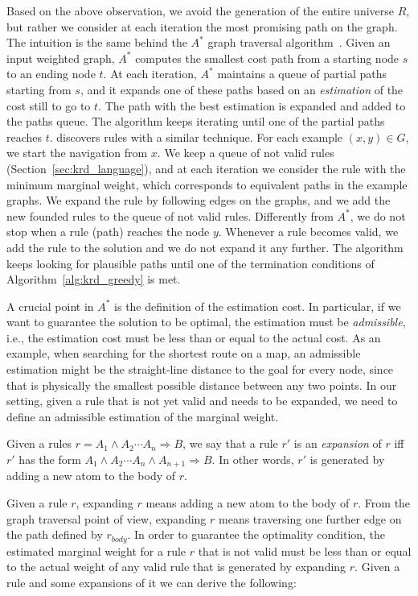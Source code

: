 Based on the above observation, we avoid the generation of the entire universe $R$, but rather we consider at each iteration the most promising path on the graph. The intuition is the same behind the $A^*$ graph traversal algorithm~\cite{hart1968formal}. Given an input weighted graph, $A^*$ computes the smallest cost path from a starting node $s$ to an ending node $t$. At each iteration, $A^*$ maintains a queue of partial paths starting from $s$, and it expands one of these paths based on an \emph{estimation} of the cost still to go to $t$. The path with the best estimation is expanded and added to the paths queue. The algorithm keeps iterating until one of the partial paths reaches $t$. \krd discovers rules with a similar technique. For each example $(x,y) \in G$, we start the navigation from $x$. We keep a queue of not valid rules (Section~\ref{sec:krd_language}), and at each iteration we consider the rule with the minimum marginal weight, which corresponds to equivalent paths in the example graphs. We expand the rule by following edges on the graphs, and we add the new founded rules to the queue of not valid rules. Differently from $A^*$, we do not stop when a rule (path) reaches the node $y$. Whenever a rule becomes valid, we add the rule to the solution and we do not expand it any further. The algorithm keeps looking for plausible paths until one of the termination conditions of Algorithm~\ref{alg:krd_greedy} is met.

A crucial point in $A^*$ is the definition of the estimation cost. In particular, if we want to guarantee the solution to be optimal, the estimation must be \emph{admissible}, i.e., the estimation cost must be less than or equal to the actual cost. As an example, when searching for the shortest route on a map, an admissible estimation might be the straight-line distance to the goal for every node, since that is physically the smallest possible distance between any two points. In our setting, given a rule that is not yet valid and needs to be expanded, we need to define an admissible estimation of the marginal weight.

\begin{definition}
	Given a rules $r = A_1 \wedge A_2 \cdots A_n \Rightarrow B$, we say that a rule $r'$ is an \emph{expansion} of $r$ iff $r'$ has the form $A_1 \wedge A_2 \cdots A_n \wedge A_{n+1} \Rightarrow B$. In other words, $r'$ is generated by adding a new atom to the body of $r$.
\end{definition}
Given a rule $r$, expanding $r$ means adding a new atom to the body of $r$. From the graph traversal point of view, expanding $r$ means traversing one further edge on the path defined by $r_{body}$. In order to guarantee the optimality condition, the estimated marginal weight for a rule $r$ that is not valid must be less than or equal to the actual weight of any valid rule that is generated by expanding $r$. Given a rule and some expansions of it we can derive the following:

